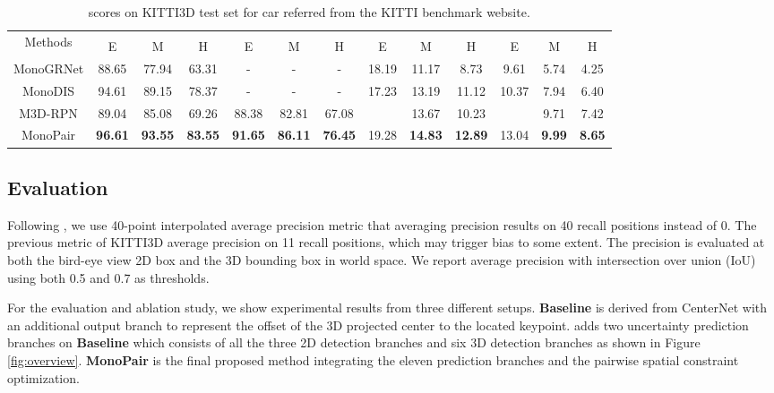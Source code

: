 \documentclass[10pt,twocolumn,letterpaper]{article}
\begin{document}
\begin{table*}[!ht]
		\centering
		\renewcommand\arraystretch{1.0}
		\renewcommand{\tabcolsep}{3pt}
		\begin{tabular}{c|ccc|ccc|ccc|ccc}
			\hline
			\multirow{2}{*}{Methods}&  \multicolumn{3}{c|}{} &  \multicolumn{3}{c|}{} &  \multicolumn{3}{c|}{} & \multicolumn{3}{c}{} \\
			\cline{2-13}
			& E & M & H  & E & M & H  & E & M & H  & E & M & H  \\
			\hline
MonoGRNet\cite{qin_monogrnet_2018} & 88.65 & 77.94 & 63.31 & - & - & - & 18.19 & 11.17 & 8.73 & 9.61 & 5.74 & 4.25 \\
			MonoDIS\cite{simonelli_disentangling_2019} &94.61 &89.15 &78.37 &- &- &- &17.23 &13.19 &11.12 &10.37 &7.94 &6.40  \\
			M3D-RPN\cite{brazil_m3d_rpn_2019} &89.04 &85.08 &69.26 &88.38 &82.81 &67.08 &  &13.67 &10.23 &  &9.71 &7.42  \\
			\hline
MonoPair & \textbf{96.61} & \textbf{93.55} & \textbf{83.55} & \textbf{91.65} & \textbf{86.11} & \textbf{76.45} & 19.28 & \textbf{14.83} & \textbf{12.89} & 13.04 & \textbf{9.99} & \textbf{8.65} \\
			\hline
		\end{tabular}
	\caption{ scores on  KITTI3D test set for car referred from the KITTI benchmark website.}
	\label{tab:ap40_test_full}
\end{table*}


\subsection{Evaluation}

Following \cite{simonelli_disentangling_2019}, we use 40-point interpolated average precision metric  that averaging precision results on 40 recall positions instead of 0. The previous metric  of KITTI3D average precision on 11 recall positions, which may trigger bias to some extent.
The precision is evaluated at both the bird-eye view 2D box  and the 3D bounding box  in world space.
We report average precision with intersection over union (IoU) using both 0.5 and 0.7 as thresholds.

For the evaluation and ablation study, we show experimental results from three different setups. \textbf{Baseline} is derived from CenterNet \cite{zhou_objects_2019} with an additional output branch to represent the offset of the 3D projected center to the located keypoint.
\textbf{} adds two uncertainty prediction branches on \textbf{Baseline} which consists of all the three 2D detection branches and six 3D detection branches as shown in Figure \ref{fig:overview}. \textbf{MonoPair} is the final proposed method integrating the eleven prediction branches and the pairwise spatial constraint optimization.
\end{document}
